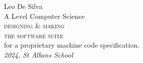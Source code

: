 \begin{titlepage}
	\raggedleft
	{\Large Leo De Silva\\[1in]}
	{\large A Level Computer Science\\}
	{\Huge\scshape designing \& making\\ the software suite\\[.2in]}
	{\large for a proprietary machine code specification.\\}
	\vfill
	{\itshape 2024, St Albans School}
\end{titlepage}
\restoregeometry
